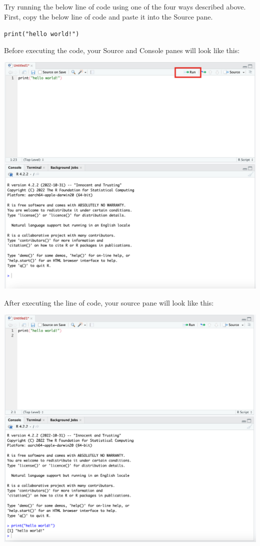 \documentclass[
  letterpaper,
  DIV=11,
  numbers=noendperiod]{scrreprt}
\begin{document}
Try running the below line of code using one of the four ways described
above. First, copy the below line of code and paste it into the Source
pane.

\texttt{print("hello\ world!")}

Before executing the code, your Source and Console panes will look like
this:

\begin{center}
\includegraphics{scripts/00_intro/class0_images/Picture4.png}
\end{center}

After executing the line of code, your source pane will look like this:

\begin{center}
\includegraphics{scripts/00_intro/class0_images/Picture5.png}
\end{center}
\end{document}
